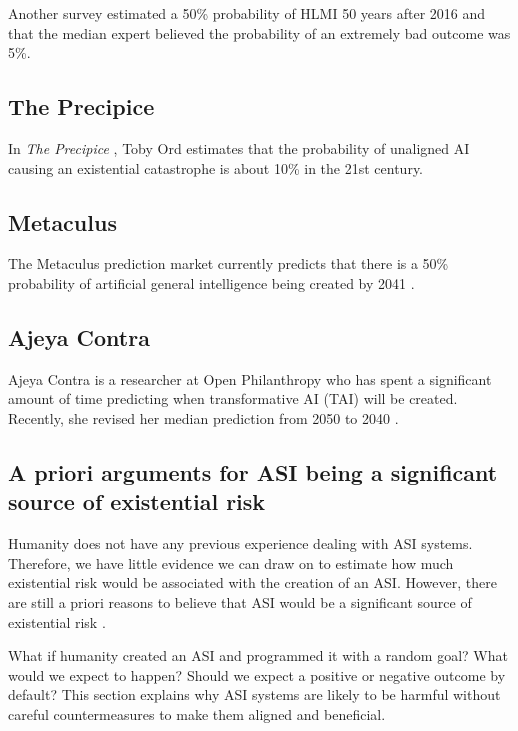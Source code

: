 \documentclass{article}
\begin{document}
Another survey \cite{aiimpactssurvey} estimated a 50\% probability of HLMI 50 years after 2016 and that the median expert believed the probability of an extremely bad outcome was 5\%.

\subsection{The Precipice}

In \textit{The Precipice} \cite{theprecipice}, Toby Ord estimates that the probability of unaligned AI causing an existential catastrophe is about 10\% in the 21st century.

\subsection{Metaculus}

The Metaculus prediction market currently predicts that there is a 50\% probability of artificial general intelligence being created by 2041 \cite{metaculus}.

\subsection{Ajeya Contra}

Ajeya Contra is a researcher at Open Philanthropy who has spent a significant amount of time predicting when transformative AI (TAI) will be created. Recently, she revised her median prediction from 2050 to 2040 \cite{twoyearupdate}.

\subsection{A priori arguments for ASI being a significant source of existential risk}

Humanity does not have any previous experience dealing with ASI systems. Therefore, we have little evidence we can draw on to estimate how much existential risk would be associated with the creation of an ASI. However, there are still a priori reasons to believe that ASI would be a significant source of existential risk  \cite{withoutspecificcountermeasures}.

What if humanity created an ASI and programmed it with a random goal? What would we expect to happen? Should we expect a positive or negative outcome by default? This section explains why ASI systems are likely to be harmful without careful countermeasures to make them aligned and beneficial.
\end{document}

